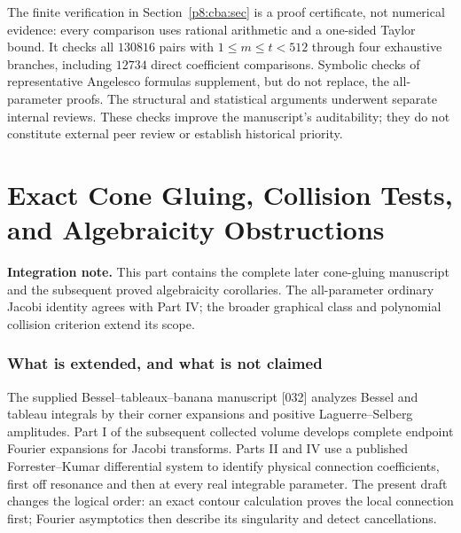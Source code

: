 \documentclass[11pt,a4paper]{article}
\theoremstyle{definition}
\theoremstyle{remark}
\numberwithin{equation}{section}
\newcommand{\collectedpart}[1]{%
 \clearpage\part{#1}%
 \setcounter{section}{0}%
 \renewcommand{\thesection}{\Roman{part}.\arabic{section}}%
 \renewcommand{\theHsection}{p\arabic{part}.s\arabic{section}}%
 \renewcommand{\arraystretch}{1}%
}
\begin{document}
The finite verification in Section~\ref{p8:cba:sec} is a proof certificate,
not numerical evidence: every comparison uses rational arithmetic and a
one-sided Taylor bound. It checks all $130816$ pairs with $1\le m\le
t<512$ through four exhaustive branches, including $12734$ direct
coefficient comparisons. Symbolic checks of representative Angelesco
formulas supplement, but do not replace, the all-parameter proofs.
The structural and statistical arguments underwent separate internal
reviews. These checks improve the manuscript's auditability; they do not
constitute external peer review or establish historical priority.


\collectedpart{Exact Cone Gluing, Collision Tests, and Algebraicity Obstructions}\label{part:9}
\begin{abstract}
We develop the endpoint analysis of earlier Bessel--Jacobi work into an
exact local contour identity. The discrepancy between the two physical
germs across a cone vertex is an outward-cone period with a fixed phase.
The proof works at resonance without dividing by exponent differences,
and without first constructing a differential equation. A polyhedral
analyticity argument applies this identity to positive weighted traces
with heterogeneous endpoint powers, nonnegative pairwise repulsion
exponents, and a positive analytic tilt. Coincident vertex heights are
handled by adding their full germs. Further applications give the exact
logarithmic and differentiability classification at every ordinary Jacobi
trace knot; a global endpoint expansion for sums of independent beta
variables; and a finite polynomial criterion for all subset-sum
collisions in integer-parameter Jacobi transforms. In the last setting
the minimal differential order equals the number of genuine density
knots. A three-variable example shows that interaction restores a
frequency whose leading corner amplitudes cancel. Classical beta
convolutions, contour continuation, and spline theory are explicitly
acknowledged; these results are not advertised as the resolution of a
newly identified historical conjecture.
\end{abstract}
\noindent\textbf{Integration note.} This part contains the complete later
cone-gluing manuscript and the subsequent proved algebraicity corollaries.
The all-parameter ordinary Jacobi identity agrees with Part IV; the broader
graphical class and polynomial collision criterion extend its scope.
\clearpage
\section{What is extended, and what is not claimed}
The supplied Bessel--tableaux--banana manuscript [032] analyzes Bessel and tableau integrals by
their corner expansions and positive Laguerre--Selberg amplitudes.
Part I of the subsequent collected volume develops complete endpoint
Fourier expansions for Jacobi transforms. Parts II and IV use a
published Forrester--Kumar differential system to identify physical
connection coefficients, first off resonance and then at every real
integrable parameter. The present draft changes the logical order:
an exact contour calculation proves the local connection first; Fourier
asymptotics then describe its singularity and detect cancellations.
\end{document}
